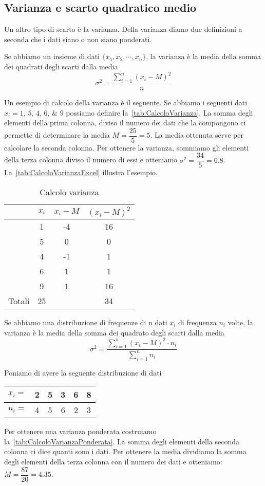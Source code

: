 \subsection{Varianza e scarto quadratico medio}
Un altro tipo di scarto è la varianza. Della varianza diamo due definizioni a seconda che i dati siano o non siano ponderati.
\begin{defn}[Varianza]
Se abbiamo un insieme di dati $\lbrace x_{1},x_{2},\cdots,x_{n}\rbrace$, la varianza  è la media della somma dei quadrati degli scarti dalla media\[\sigma^{2}=\dfrac{\sum_{i=1}^{n}(x_{i}-M)^2}{n}  \] 
\end{defn}
Un esempio di calcolo della varianza è il seguente. 
Se abbiamo i seguenti dati $x_{i}=\numlist{1;5;4;6;9}$ possiamo definire la~\vref{tab:CalcoloVarianza}. La somma degli elementi della prima colonna, diviso il numero dei dati che la compongono ci permette  di determinare la media $M=\dfrac{\num{25}}{\num{5}}=\num{5}$. 
La media ottenuta serve per  calcolare la seconda colonna. Per ottenere la varianza, sommiamo gli elementi della terza colonna diviso il numero di essi e otteniamo $\sigma^2=\dfrac{34}{5}=\num{6,8}$. La~\vref{tab:CalcoloVarianzaExcel} illustra l'esempio.
\begin{table}
	\centering
	\begin{tabular}{l*{3}{S[table-format=2.0]}}
		\toprule
		& {$x_i$} & {$x_i-M$} &{$(x_i-M )^2$}  \\ 
		\midrule
			&  1& -4 & 16 \\ 
			&  5&  0&  0\\ 
			&  4&  -1&  1\\ 
			&  6&  1&  1\\ 
			&  9&  1&  16\\ 
		\midrule
	{Totali}	& 25 &  &34  \\ 
		\bottomrule
	\end{tabular} 
	\caption{Calcolo varianza}
	\label{tab:CalcoloVarianza}
\end{table}
\begin{defn}
		Se abbiamo una distribuzione di frequenze di n dati  $x_{i}$ di frequenza $n_{i}$ volte, la varianza  è la media della somma dei quadrato degli scarti dalla media\[\sigma^{2}=\dfrac{\sum_{i=1}^{n}(x_{i}-M)^{2}\cdot n_{i}}{\sum_{i=1}^{n} n_{i}}\] 
\end{defn}
Poniamo di avere la seguente distribuzione di dati
\begin{center}
	\begin{tabular}{l*{5} {S[table-format=1.0]}}
		{$x_{i}=$}	&2  &5  &3  &6  &8 \\
		\midrule 
		{$n_{i}=$}	& 4 &5  & 6 & 2 & 3\\   
	\end{tabular}
\end{center}
Per ottenere una varianza ponderata costruiamo la~\vref{tab:CalcoloVarianzaPonderata}. La somma degli elementi della seconda colonna ci dice quanti sono i dati. Per ottenere la media dividiamo la somma degli elementi della terza colonna con il numero dei dati e otteniamo: $M=\dfrac{87}{20}=\num{4.35}$. 

